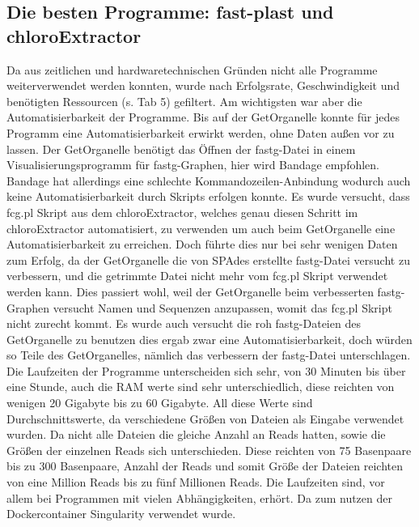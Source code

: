 \documentclass{scrartcl}
\begin{document}
\subsection{Die besten Programme: fast-plast und chloroExtractor}
\label{sec-4-5}
Da aus zeitlichen und hardwaretechnischen Gründen nicht alle Programme weiterverwendet werden konnten, wurde nach Erfolgsrate, Geschwindigkeit und benötigten Ressourcen (s. Tab 5)
gefiltert. Am wichtigsten war aber die Automatisierbarkeit der Programme. Bis auf der GetOrganelle konnte für jedes Programm eine Automatisierbarkeit
erwirkt werden, ohne Daten außen vor zu lassen. Der GetOrganelle benötigt das Öffnen der fastg-Datei in einem Visualisierungsprogramm für fastg-Graphen, hier wird Bandage empfohlen.
Bandage hat allerdings eine schlechte Kommandozeilen-Anbindung wodurch auch keine Automatisierbarkeit durch Skripts erfolgen konnte.
Es wurde versucht, dass fcg.pl Skript aus dem chloroExtractor, welches genau diesen Schritt im chloroExtractor automatisiert, zu verwenden um auch beim
GetOrganelle eine Automatisierbarkeit zu erreichen. Doch führte dies nur bei sehr wenigen Daten zum Erfolg, da der GetOrganelle die von SPAdes erstellte 
fastg-Datei versucht zu verbessern, und die getrimmte Datei nicht mehr vom fcg.pl Skript verwendet werden kann. Dies passiert wohl, weil der GetOrganelle beim verbesserten
fastg-Graphen versucht Namen und Sequenzen anzupassen, womit das fcg.pl Skript nicht zurecht kommt. Es wurde auch versucht die roh fastg-Dateien des GetOrganelle zu benutzen
dies ergab zwar eine Automatisierbarkeit, doch würden so Teile des GetOrganelles, nämlich das verbessern der fastg-Datei unterschlagen.
Die Laufzeiten der Programme unterscheiden sich sehr, von 30 Minuten bis über eine Stunde, auch die RAM werte sind sehr unterschiedlich, diese
reichten von wenigen 20 Gigabyte bis zu 60 Gigabyte. All diese Werte sind Durchschnittswerte, da verschiedene Größen von Dateien als Eingabe verwendet wurden. Da nicht alle
Dateien die gleiche Anzahl an Reads hatten, sowie die Größen der einzelnen Reads sich unterschieden. Diese reichten von 75 Basenpaare bis zu 300 Basenpaare, Anzahl der Reads
und somit Größe der Dateien reichten von eine Million Reads bis zu fünf Millionen Reads. Die Laufzeiten sind, vor allem bei Programmen mit vielen Abhängigkeiten, erhört. Da zum nutzen
der Dockercontainer Singularity \footnotemark[18]{} verwendet wurde.    
\end{document}
